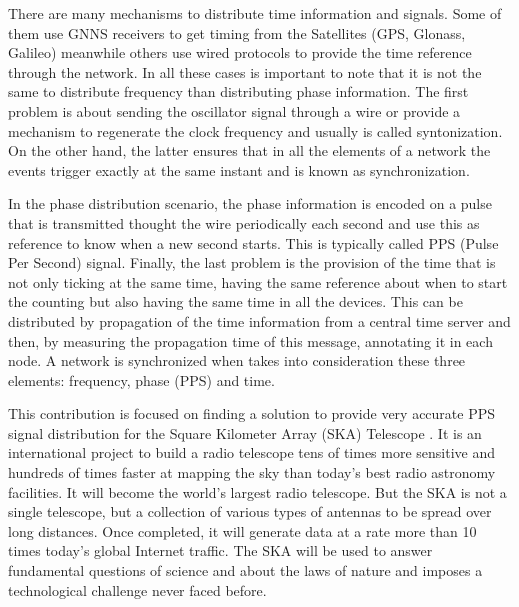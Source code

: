 There are many mechanisms to distribute time information and signals. Some of them use GNNS receivers to get timing from the Satellites (GPS, Glonass, Galileo) meanwhile others use wired protocols to provide the time reference through the network. In all these cases is important to note that it is not the same to distribute frequency than distributing phase information. The first problem is about sending the oscillator signal through a wire or provide a mechanism to regenerate the clock frequency and usually is called syntonization. On the other hand, the latter ensures that in all the elements of a network the events trigger exactly at the same instant and is known as synchronization. 

In the phase distribution scenario, the phase information is encoded on a pulse that is transmitted thought the wire periodically each second and use this as reference to know when a new second starts. This is typically called PPS (Pulse Per Second) signal. Finally, the last problem is the provision of the time that is not only ticking at the same time, having the same reference about when to start the counting but also having the same time in all the devices. This can be distributed by propagation of the time information from a central time server and then, by measuring the propagation time of this message, annotating it in each node. A network is synchronized when takes into consideration these three elements: frequency, phase (PPS) and time.

This contribution is focused on finding a solution to provide very accurate PPS 
signal distribution for the Square Kilometer Array (SKA) Telescope 
\cite{ska:project_website}. It is an international project to build a radio 
telescope tens of times more sensitive and hundreds of times faster at mapping 
the sky than today’s best radio astronomy facilities. It will become the 
world’s largest radio telescope. But the SKA is not a single telescope, but a 
collection of various types of antennas to be spread over long distances. Once 
completed, it will generate data at a rate more than 10 times today’s global 
Internet traffic. The SKA will be used to answer fundamental questions of 
science and about the laws of nature and imposes a technological challenge 
never faced before. 

